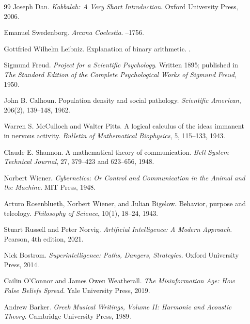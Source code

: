 \documentclass[11pt]{book}
\begin{document}
\begin{thebibliography}{99}
Joseph Dan.
\newblock \emph{Kabbalah: A Very Short Introduction}.
\newblock Oxford University Press, 2006.

Emanuel Swedenborg.
\newblock \emph{Arcana Coelestia}.
--1756.

Gottfried Wilhelm Leibniz.
\newblock Explanation of binary arithmetic.
.

Sigmund Freud.
\newblock \emph{Project for a Scientific Psychology}.
\newblock Written 1895; published in \emph{The Standard Edition of the Complete Psychological Works of Sigmund Freud}, 1950.

John B. Calhoun.
\newblock Population density and social pathology.
\newblock \emph{Scientific American}, 206(2), 139--148, 1962.

Warren S. McCulloch and Walter Pitts.
\newblock A logical calculus of the ideas immanent in nervous activity.
\newblock \emph{Bulletin of Mathematical Biophysics}, 5, 115--133, 1943.

Claude E. Shannon.
\newblock A mathematical theory of communication.
\newblock \emph{Bell System Technical Journal}, 27, 379--423 and 623--656, 1948.

Norbert Wiener.
\newblock \emph{Cybernetics: Or Control and Communication in the Animal and the Machine}.
\newblock MIT Press, 1948.

Arturo Rosenblueth, Norbert Wiener, and Julian Bigelow.
\newblock Behavior, purpose and teleology.
\newblock \emph{Philosophy of Science}, 10(1), 18--24, 1943.

Stuart Russell and Peter Norvig.
\newblock \emph{Artificial Intelligence: A Modern Approach}.
\newblock Pearson, 4th edition, 2021.

Nick Bostrom.
\newblock \emph{Superintelligence: Paths, Dangers, Strategies}.
\newblock Oxford University Press, 2014.

Cailin O'Connor and James Owen Weatherall.
\newblock \emph{The Misinformation Age: How False Beliefs Spread}.
\newblock Yale University Press, 2019.

Andrew Barker.
\newblock \emph{Greek Musical Writings, Volume II: Harmonic and Acoustic Theory}.
\newblock Cambridge University Press, 1989.


\end{thebibliography}
\end{document}
